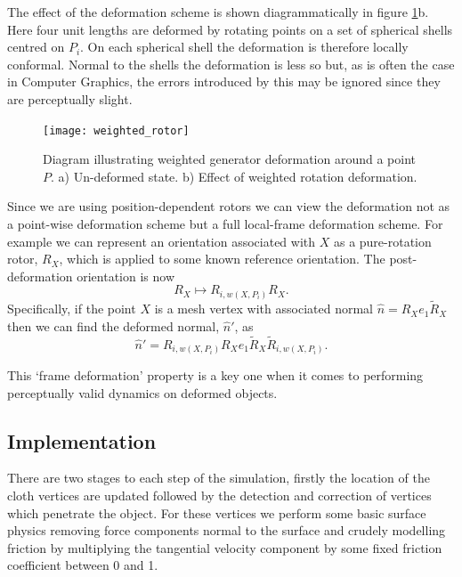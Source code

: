The effect of the deformation scheme is shown diagrammatically in figure
\ref{fig:weighted_rotor}b. Here four unit lengths are deformed by rotating points
on a set of spherical shells centred on $P_i$. On each spherical shell the deformation
is therefore locally conformal. Normal to the shells the deformation is less so but,
as is often the case in Computer Graphics, the errors introduced by this
may be ignored since they are perceptually slight.

\begin{figure}
\centering
\texttt{[image: weighted\_rotor]}
\caption{\label{fig:weighted_rotor}%
  Diagram illustrating weighted generator deformation around a point $P$. 
          a) Un-deformed state. b) Effect of weighted rotation deformation.
}
\end{figure}

Since we are using position-dependent rotors we can view the deformation not as a point-wise 
deformation scheme but a full local-frame deformation scheme. For example we can represent an
orientation associated with $X$ as a pure-rotation rotor, $R_X$, which is applied to some known
reference orientation. The post-deformation orientation is now
\[
R_X \mapsto R_{i,w(X,P_i)}R_X.
\]
Specifically, if the point $X$ is a mesh vertex with associated normal
$\hat{n} = R_Xe_1\tilde{R}_X$ then we can find the deformed normal, $\hat{n}'$, as
\[
\hat{n}' = R_{i,w(X,P_i)}R_Xe_1\tilde{R}_X\tilde{R}_{i,w(X,P_i)}.
\]

This `frame deformation' property is a key one when it comes to performing perceptually
valid dynamics on deformed objects.


\subsection{Implementation}

There are two stages to each step of the simulation, firstly the location of
the cloth vertices are updated followed by the detection and correction of
vertices which penetrate the object. For these vertices we perform some basic
surface physics removing force components normal to the surface and crudely
modelling friction by multiplying the tangential velocity component by some
fixed friction coefficient between 0 and 1.

